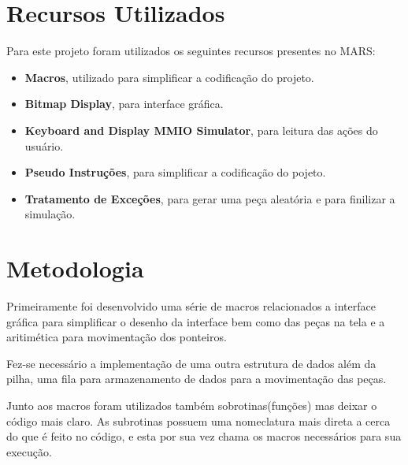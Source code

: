 \documentclass{article}
\begin{document}

\section{Recursos Utilizados}

Para este projeto foram utilizados os seguintes recursos presentes no MARS:
\begin{itemize}
  \item \textbf{Macros}, utilizado para simplificar a codificação do projeto.
  \item \textbf{Bitmap Display}, para interface gráfica.
  \item \textbf{Keyboard and Display MMIO Simulator}, para leitura das ações do usuário.
  \item \textbf{Pseudo Instruções}, para simplificar a codificação do pojeto.
  \item \textbf{Tratamento de Exceções}, para gerar uma peça aleatória e para finilizar a simulação.
\end{itemize}


\section{Metodologia}

Primeiramente foi desenvolvido uma série de macros relacionados a interface gráfica para simplificar o desenho da interface bem como das peças na tela e a aritimética para movimentação dos ponteiros.

Fez-se necessário a implementação de uma outra estrutura de dados além da pilha, uma fila para armazenamento de dados para a movimentação das peças.

Junto aos macros foram utilizados também sobrotinas(funções) mas deixar o código mais claro. As subrotinas possuem uma nomeclatura mais direta a cerca do que é feito no código, e esta por sua vez chama os macros necessários para sua execução.
\end{document}
